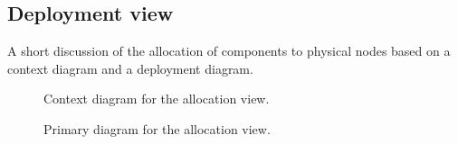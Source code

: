 \documentclass[a4paper,10pt]{article}
\begin{document}
\subsection{Deployment view}
A short discussion of the allocation of components to physical nodes based on a
context diagram and a deployment diagram.

\begin{figure}[!htp]
    \centering
    \caption{Context diagram for the allocation view.}\label{fig:depl_context}
\end{figure}

\begin{figure}[!htp]
    \centering
    \caption{Primary diagram for the allocation view.}\label{fig:depl_main}
\end{figure}
\end{document}
